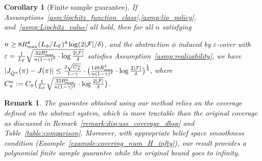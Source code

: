 \documentclass[twoside]{article}
\newtheorem{corollary}{Corollary}
\newtheorem{remark}{Remark}
\newcommand{\CAL}[1]{\mathcal{#1}}
\newcommand{\yplu}[1]{{\color{orange}{ [\textbf{Yiping:}} #1]}}
\begin{document}
\begin{corollary}[Finite sample guarantee]\label{coro:finite_sample_1}
    If Assumptions~\ref{asm:lipchitz_function_class},\ref{asmp:lip_policy}, and~\ref{asmp:Lipchitz_value} all hold, then for all $n$ satisfying

$n\geq 8R_{\rm max}^4(L_\phi/L_\CAL{E})^4\log(2|\CAL{F}|/\delta)$,
   and the abstraction $\phi$ induced by $\varepsilon$-cover with $\varepsilon=\frac{1}{L_\CAL{E}}\sqrt{\frac{32R_{\rm max}^4}{n(1-\gamma)^4}\cdot\log\frac{2|\mathcal{F}|}{\delta}}$ %
satisfies Assumption~\ref{asmp:realizability}, we have
$
|J_{\hat{Q}^\pi}(\pi)-J(\pi)|\leq\frac{2\sqrt{C_\pi^n}}{1-\gamma}\cdot
        \big(\frac{128R_{\rm max}^4}{n(1-\gamma)^4}\cdot\log\frac{2|\mathcal{F}|}{\delta}\big)^{\frac{1}{4}},
$
where $C_\pi^n:=C_\pi\big(\frac{1}{L_\CAL{E}}\sqrt{\frac{32R_{\rm max}^4}{n(1-\gamma)^4}\cdot\log\frac{2|\mathcal{F}|}{\delta}}\big)$.
\end{corollary}
\begin{remark}
    The guarantee obtained using our method relies on the coverage defined on the abstract system, which is more tractable than the original coverage as discussed in Remark~\ref{remark:discuss_coverage_dbsp} and Table~\ref{table:comparison}. Moreover, with appropriate belief space smoothness condition (Example~\ref{example:covering_num_H_infty}), our result provides a polynomial finite sample guarantee while the original bound goes to infinity. 
\end{remark}
\end{document}
